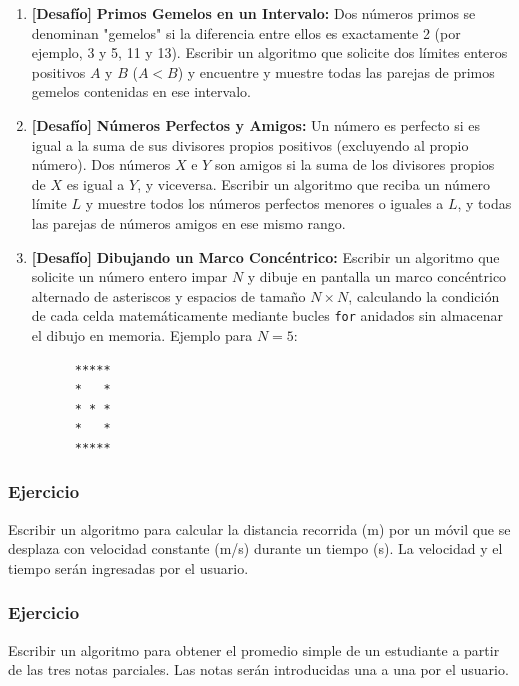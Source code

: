 \begin{ejercicioClase}
\begin{enumerate}
    \item \textbf{[Desafío]} \textbf{Primos Gemelos en un Intervalo:} Dos números primos se denominan "gemelos" si la diferencia entre ellos es exactamente 2 (por ejemplo, 3 y 5, 11 y 13). Escribir un algoritmo que solicite dos límites enteros positivos $A$ y $B$ ($A < B$) y encuentre y muestre todas las parejas de primos gemelos contenidas en ese intervalo.
    \item \textbf{[Desafío]} \textbf{Números Perfectos y Amigos:} Un número es perfecto si es igual a la suma de sus divisores propios positivos (excluyendo al propio número). Dos números $X$ e $Y$ son amigos si la suma de los divisores propios de $X$ es igual a $Y$, y viceversa. Escribir un algoritmo que reciba un número límite $L$ y muestre todos los números perfectos menores o iguales a $L$, y todas las parejas de números amigos en ese mismo rango.
    \item \textbf{[Desafío]} \textbf{Dibujando un Marco Concéntrico:} Escribir un algoritmo que solicite un número entero impar $N$ y dibuje en pantalla un marco concéntrico alternado de asteriscos y espacios de tamaño $N \times N$, calculando la condición de cada celda matemáticamente mediante bucles \texttt{for} anidados sin almacenar el dibujo en memoria. Ejemplo para $N = 5$:
      \begin{verbatim}
      *****
      *   *
      * * *
      *   *
      *****
      \end{verbatim}
  \end{enumerate}
\end{ejercicioClase}



\subsubsection{Ejercicio}
Escribir un algoritmo para calcular la distancia recorrida (m) por un móvil que se desplaza con velocidad constante (m/s) durante un tiempo (s). 
La velocidad y el tiempo serán ingresadas por el usuario.

\subsubsection{Ejercicio}
Escribir un algoritmo para obtener el promedio simple de un estudiante a partir de las tres notas parciales.
Las notas serán introducidas una a una por el usuario.

